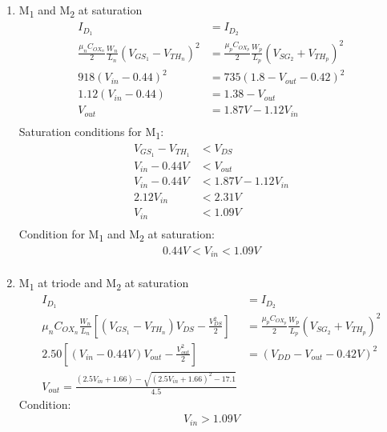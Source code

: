 \documentclass{article}
\begin{document}
\begin{enumerate}[(a)]
\begin{enumerate}[1.]
\item M\textsubscript{1} and M\textsubscript{2} at saturation
\begin{equation*}
\begin{aligned}
I_{D_{1}} &= I_{D_{2}} \\
\frac{\mu_{n}C_{OX_{n}}}{2}\frac{W_{n}}{L_{n}}(V_{GS_{1}} - V_{TH_{n}})^{2} &=
\frac{\mu_{p}C_{OX_{p}}}{2}\frac{W_{p}}{L_{p}}(V_{SG_{2}} + V_{TH_{p}})^{2} \\
918(V_{in} - 0.44)^{2} &= 735(1.8 - V_{out} - 0.42)^{2} \\
1.12(V_{in} - 0.44) &= 1.38 - V_{out} \\
V_{out} &= 1.87V - 1.12V_{in} \\
\end{aligned}
\end{equation*}
Saturation conditions for M\textsubscript{1}:
\begin{equation*}
\begin{aligned}
V_{GS_{1}} - V_{TH_{1}} &< V_{DS} \\
V_{in} - 0.44V &< V_{out} \\
V_{in} - 0.44V &< 1.87V - 1.12V_{in} \\
2.12V_{in} &< 2.31V \\
V_{in} &< 1.09V \\
\end{aligned}
\end{equation*}
Condition for M\textsubscript{1} and M\textsubscript{2} at saturation:
\begin{equation*}
\begin{aligned}
0.44V < V_{in} < 1.09V \\
\end{aligned}
\end{equation*}

\item M\textsubscript{1} at triode and M\textsubscript{2} at saturation
\begin{equation*}
\begin{aligned}
I_{D_{1}} &= I_{D_{2}} \\
\mu_{n}C_{OX_{n}}\frac{W_{n}}{L_{n}}[(V_{GS_{1}} - V_{TH_{n}})V_{DS} - \frac{V_{DS}^2}{2}] &=
\frac{\mu_{p}C_{OX_{p}}}{2}\frac{W_{p}}{L_{p}}(V_{SG_{2}} + V_{TH_{p}})^{2} \\
2.50[(V_{in} - 0.44V)V_{out} - \frac{V_{out}^2}{2}] &= (V_{DD} - V_{out} - 0.42V)^{2} \\
V_{out} = \frac{(2.5V_{in} + 1.66) - \sqrt{(2.5V_{in} + 1.66)^{2} - 17.1}}{4.5}
\end{aligned}
\end{equation*}
Condition:
\begin{equation*}
\begin{aligned}
V_{in} > 1.09V \\
\end{aligned}
\end{equation*}
\end{enumerate}


\end{enumerate}
\end{document}
